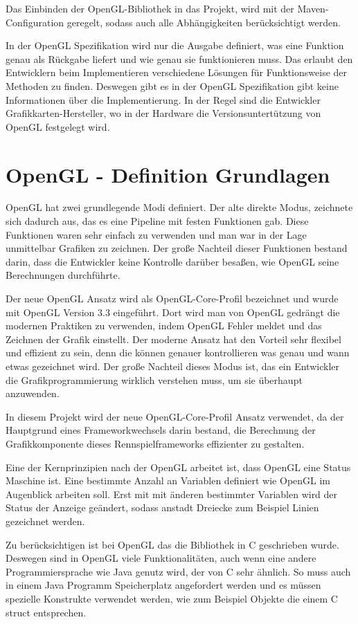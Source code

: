 Das Einbinden der OpenGL-Bibliothek in das Projekt, wird mit der Maven-Configuration geregelt, sodass auch alle Abhängigkeiten berücksichtigt werden. 

In der OpenGL Spezifikation wird nur die Ausgabe definiert, was eine Funktion genau als Rückgabe liefert und wie genau sie funktionieren muss. Das erlaubt den Entwicklern beim Implementieren verschiedene Lösungen für Funktionsweise der Methoden zu finden. Deswegen gibt es in der OpenGL Spezifikation gibt keine Informationen über die Implementierung. In der Regel sind die Entwickler Grafikkarten-Hersteller, wo in der Hardware die Versionsuntertützung von OpenGL festgelegt wird.

\chapter*{OpenGL - Definition Grundlagen}

OpenGL hat zwei grundlegende Modi definiert. Der alte direkte Modus, zeichnete sich dadurch aus, das es eine Pipeline mit festen Funktionen gab. Diese Funktionen waren sehr einfach zu verwenden und man war in der Lage unmittelbar Grafiken zu zeichnen. Der große Nachteil dieser Funktionen bestand darin, dass die Entwickler keine Kontrolle darüber besaßen, wie OpenGL seine Berechnungen durchführte. 

Der neue OpenGL Ansatz wird als OpenGL-Core-Profil bezeichnet und wurde mit OpenGL Version 3.3 eingeführt. Dort wird man von OpenGL gedrängt die modernen Praktiken zu verwenden, indem OpenGL Fehler meldet und das Zeichnen der Grafik einstellt. Der moderne Ansatz hat den Vorteil sehr flexibel und effizient zu sein, denn die können genauer kontrollieren was genau und wann etwas gezeichnet wird. Der große Nachteil dieses Modus ist, das ein Entwickler die Grafikprogrammierung wirklich verstehen muss, um sie überhaupt anzuwenden.

In diesem Projekt wird der neue OpenGL-Core-Profil Ansatz verwendet, da der Hauptgrund eines Frameworkwechsels darin bestand, die Berechnung der Grafikkomponente dieses Rennspielframeworks effizienter zu gestalten.

Eine der Kernprinzipien nach der OpenGL arbeitet ist, dass OpenGL eine Status Maschine ist. Eine bestimmte Anzahl an Variablen definiert wie OpenGL im Augenblick arbeiten soll. Erst mit mit änderen bestimmter Variablen wird der Status der Anzeige geändert, sodass anstadt Dreiecke zum Beispiel Linien gezeichnet werden.

Zu berücksichtigen ist bei OpenGL das die Bibliothek in C geschrieben wurde. Deswegen sind in OpenGL viele Funktionalitäten, auch wenn eine andere Programmiersprache wie Java genutz wird, der von C sehr ähnlich. So muss auch in einem Java Programm Speicherplatz angefordert werden und es müssen spezielle Konstrukte verwendet werden, wie zum Beispiel Objekte die einem C struct entsprechen.

